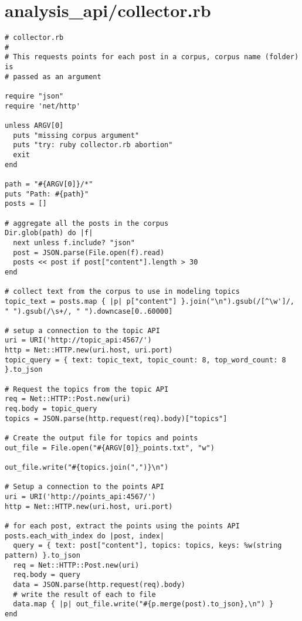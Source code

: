 \documentclass{article}
\begin{document}
\section*{analysis\_api/collector.rb}
\begin{verbatim}
# collector.rb
#
# This requests points for each post in a corpus, corpus name (folder) is
# passed as an argument

require "json"
require 'net/http'

unless ARGV[0]
  puts "missing corpus argument"
  puts "try: ruby collector.rb abortion"
  exit
end

path = "#{ARGV[0]}/*"
puts "Path: #{path}"
posts = []

# aggregate all the posts in the corpus
Dir.glob(path) do |f|
  next unless f.include? "json"
  post = JSON.parse(File.open(f).read)
  posts << post if post["content"].length > 30
end

# collect text from the corpus to use in modeling topics
topic_text = posts.map { |p| p["content"] }.join("\n").gsub(/[^\w']/, " ").gsub(/\s+/, " ").downcase[0..60000]

# setup a connection to the topic API
uri = URI('http://topic_api:4567/')
http = Net::HTTP.new(uri.host, uri.port)
topic_query = { text: topic_text, topic_count: 8, top_word_count: 8 }.to_json

# Request the topics from the topic API
req = Net::HTTP::Post.new(uri)
req.body = topic_query
topics = JSON.parse(http.request(req).body)["topics"]

# Create the output file for topics and points
out_file = File.open("#{ARGV[0]}_points.txt", "w")

out_file.write("#{topics.join(",")}\n")

# Setup a connection to the points API
uri = URI('http://points_api:4567/')
http = Net::HTTP.new(uri.host, uri.port)

# for each post, extract the points using the points API
posts.each_with_index do |post, index|
  query = { text: post["content"], topics: topics, keys: %w(string pattern) }.to_json
  req = Net::HTTP::Post.new(uri)
  req.body = query
  data = JSON.parse(http.request(req).body)
  # write the result of each to file
  data.map { |p| out_file.write("#{p.merge(post).to_json},\n") }
end


\end{verbatim}
\pagebreak
\end{document}
